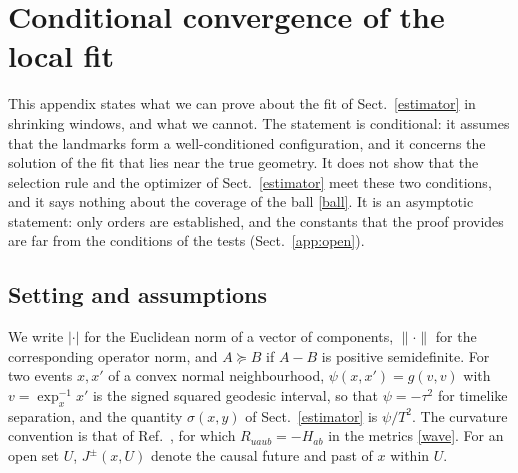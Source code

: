 \section{Conditional convergence of the local fit}\label{app:conv}
This appendix states what we can prove about the fit of
Sect.~\ref{estimator} in shrinking windows, and what we cannot. The
statement is conditional: it assumes that the landmarks form a
well-conditioned configuration, and it concerns the solution of the fit that
lies near the true geometry. It does not show that the selection rule and
the optimizer of Sect.~\ref{estimator} meet these two conditions, and it
says nothing about the coverage of the ball \eqref{ball}. It is an
asymptotic statement: only orders are established, and the constants that
the proof provides are far from the conditions of the tests
(Sect.~\ref{app:open}).

\subsection{Setting and assumptions}\label{app:setting}
We write $|\cdot|$ for the Euclidean norm of a vector of components,
$\|\cdot\|$ for the corresponding operator norm, and $A\succeq B$ if $A-B$
is positive semidefinite. For two events $x,x'$ of a convex normal
neighbourhood, $\psi(x,x')=g(v,v)$ with $v=\exp_x^{-1}x'$ is the signed
squared geodesic interval, so that $\psi=-\tau^2$ for timelike separation,
and the quantity $\sigma(x,y)$ of Sect.~\ref{estimator} is $\psi/T^2$. The
curvature convention is that of Ref.~\cite{brewin}, for which
$R_{uaub}=-H_{ab}$ in the metrics \eqref{wave}. For an open set $U$,
$J^\pm(x,U)$ denote the causal future and past of $x$ within $U$.

